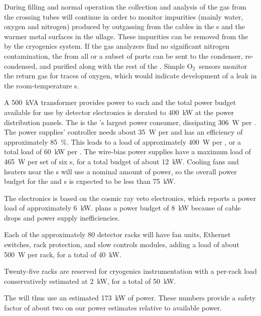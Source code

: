 During filling and normal operation the collection and analysis of the gas from the crossing tubes will continue in order to monitor impurities (mainly water, oxygen and nitrogen) produced by outgassing from the cables in the \fdth{}s and the warmer metal surfaces in the ullage. These impurities can be removed from the  by the cryogenics system.
If the gas analyzers find no significant nitrogen contamination, the  from all or a subset of ports can be sent to the condenser, re-condensed, and purified along with the rest of the . Simple O$_2$\ sensors monitor the return gas for traces of oxygen, which would indicate development of a leak in the room-temperature \fdth{}s.

A \SI{500}{kVA} transformer provides power to each  and the total power budget available for use by detector electronics is derated to \SI{400}{kW} at the power distribution panels.  
The  is the 's largest power consumer,  dissipating \SI{306}{W} per .  
The  power supplies' controller needs about \SI{35}{W} per  and has an efficiency of approximately \SI{85}{\%}. 
This leads to a load of  approximately  \SI{400}{W}  per , or a total load of  \SI{60}{kW} per .  
The  wire-bias power supplies have a maximum load of  \SI{465}{W} per set of six s, for a total budget of about   \SI{12}{kW}.   
Cooling fans and heaters near the \fdth{}s will use a nominal amount of power, so the overall power budget for the  and  s is expected to be less than \SI{75}{kW}.


The  electronics is based on the  cosmic ray veto electronics, which reports a power load of approximately  \SI{6}{kW}.   plans a power budget of  \SI{8}{kW} because of cable drops and  power supply inefficiencies.  

Each of the approximately 80 detector racks will have fan units, Ethernet switches, rack protection, and slow controls modules, adding a load of about \SI{500}{W} per rack, for a total of \SI{40}{kW}.

Twenty-five racks are reserved for cryogenics instrumentation with a per-rack load conservatively estimated at \SI{2}{kW}, for a total of \SI{50}{kW}. 

The  will thus use  an estimated \SI{173}{kW} of power.   These numbers provide a safety factor of about two on our power estimates relative to available power.


